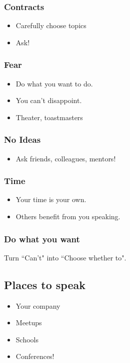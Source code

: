 \documentclass{beamer}
\begin{document}
\begin{frame}[fragile]
\frametitle{Contracts}
\begin{itemize}[<+(1)->]
\item Carefully choose topics
\item Ask!
\end{itemize}
\end{frame}

\begin{frame}[fragile]
\frametitle{Fear}
\begin{itemize}[<+(1)->]
\item Do what you want to do.
\item You can't disappoint.
\item Theater, toastmasters
\end{itemize}
\end{frame}

\begin{frame}[fragile]
\frametitle{No Ideas}
\begin{itemize}[<+(1)->]
\item Ask friends, colleagues, mentors!
\end{itemize}
\end{frame}

\begin{frame}[fragile]
\frametitle{Time}
\begin{itemize}[<+(1)->]
\item Your time is your own.
\item Others benefit from you speaking.
\end{itemize}
\end{frame}

\begin{frame}[fragile]
\frametitle{Do what you want}
Turn ``Can't" into ``Choose whether to".
\end{frame}

\subsection{Places to speak}

\begin{frame}[fragile]
\tableofcontents[currentsubsection]
\end{frame}

\begin{frame}[fragile]
\begin{itemize}[<+(1)->]
\item Your company
\item Meetups
\item Schools
\item Conferences!
\end{itemize}
\end{frame}
\end{document}
